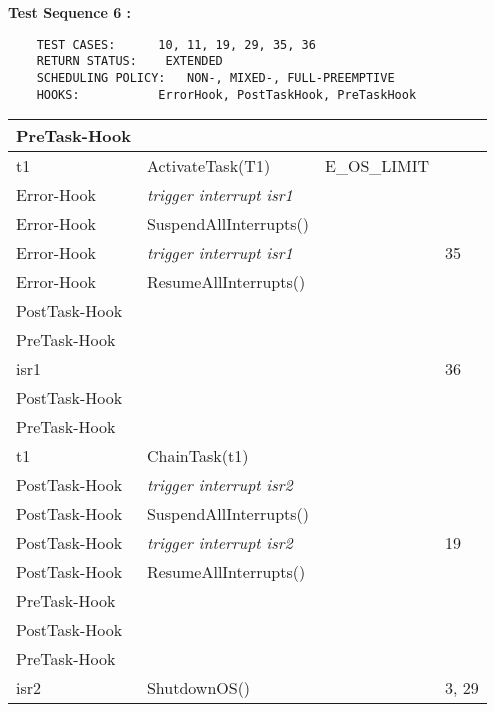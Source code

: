 \documentclass[10pt]{article}
\newlength{\Li}\settowidth{\Li}{Running}
\newlength{\Lii}\setlength{\Lii}{7cm}
\newlength{\Liiii}\setlength{\Liiii}{0.9cm}
\newlength{\Liii}\setlength{\Liii}{\textwidth} \addtolength{\Liii}{-\Li} \addtolength{\Liii}{-\Lii} \addtolength{\Liii}{-\Liiii}
\begin{document}
	\textbf{Test Sequence 6 :}
	\begin{lstlisting}
	TEST CASES:		 10, 11, 19, 29, 35, 36
	RETURN STATUS:	  EXTENDED
	SCHEDULING POLICY:   NON-, MIXED-, FULL-PREEMPTIVE
	HOOKS:			 ErrorHook, PostTaskHook, PreTaskHook
	\end{lstlisting}
	
	
	\begin{supertabular}{|p{\Li}|p{\Lii}|p{\Liii}|p{\Liiii}|} \hline
	PreTask-Hook	&										&				& \\ \hline
	
	t1			& ActivateTask(T1)							& E\_OS\_LIMIT	& \\ \hline
	
	Error-Hook	& \textit{trigger interrupt isr1}					&				& \\ \hline
	Error-Hook	& SuspendAllInterrupts()						&				& \\ \hline
	Error-Hook	& \textit{trigger interrupt isr1}					&				& 35 \\ \hline
	Error-Hook	& ResumeAllInterrupts()						&				& \\ \hline
	
	PostTask-Hook	&										&				& \\ \hline
	PreTask-Hook	&										&				& \\ \hline
	
	isr1			& 										& 				& 36 \\ \hline
	
	PostTask-Hook	&										&				& \\ \hline
	PreTask-Hook	&										&				& \\ \hline
	
	t1			& ChainTask(t1)						 	& 				&  \\ \hline 
	
	PostTask-Hook	& \textit{trigger interrupt isr2}					&				& \\ \hline
	PostTask-Hook	& SuspendAllInterrupts()						&				& \\ \hline
	PostTask-Hook	& \textit{trigger interrupt isr2}					&				& 19\\ \hline
	PostTask-Hook	& ResumeAllInterrupts()						&				& \\ \hline
	PreTask-Hook	&										&				& \\ \hline
	
	PostTask-Hook	&										&				& \\ \hline
	PreTask-Hook	&										&				& \\ \hline
		
	isr2			& ShutdownOS()							& 				& 3, 29 \\ \hline
	
	\end{supertabular}\\
	
\end{document}
